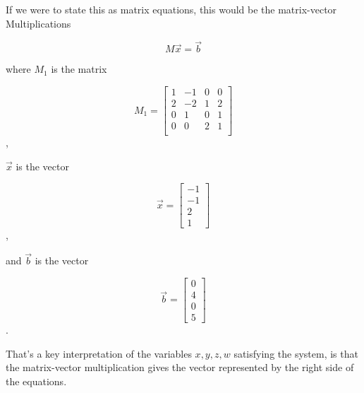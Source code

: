 \documentclass{ximera}
\begin{document}
If we were to state this as matrix equations, this would be the matrix-vector Multiplications

$$M\vec{x}=\vec{b}$$

where $M_1$ is the matrix 

\begin{equation}
  M_1=\begin{bmatrix}
    1 & -1 & 0 & 0 \\
    2 & -2 & 1 & 2 \\
    0 & 1  & 0 & 1 \\
    0 & 0  & 2 & 1 \\
  \end{bmatrix}
\end{equation},

$\vec{x}$ is the vector

\begin{equation}
  \vec{x}=\begin{bmatrix}
    -1 \\
    -1  \\
    2 \\
    1  
  \end{bmatrix}
\end{equation},

and $\vec{b}$ is the vector

\begin{equation}
  \vec{b}=\begin{bmatrix}
    0 \\
    4  \\
    0 \\
    5  
  \end{bmatrix}
\end{equation}.

That's a key interpretation of the variables $x, y, z, w$ satisfying the system, is that the matrix-vector multiplication gives the vector represented by the right side of the equations.
\end{document}
